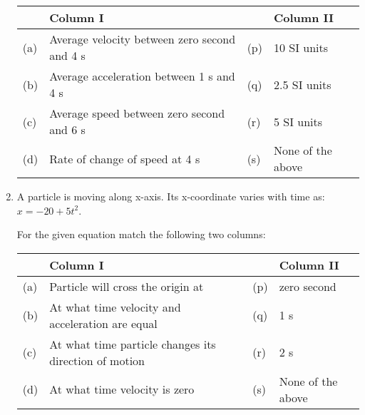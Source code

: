 \documentclass{article}
\begin{document}
\begin{enumerate}
    \begin{center}
        \renewcommand{\arraystretch}{2}
        \begin{table}[h]
            \centering
            \begin{tabular}{p{0.25cm}p{7cm}|p{0.25cm}p{6cm}}
            \hline
            & Column I & & Column II \\
            \hline
            (a) & Average velocity between zero second and 4 s & (p) & 10 SI units \\
            (b) & Average acceleration between 1 s and 4 s & (q) & 2.5 SI units \\
            (c) & Average speed between zero second and 6 s & (r) & 5 SI units \\
            (d) & Rate of change of speed at 4 s & (s) & None of the above \\
            \hline
            \end{tabular}
        \end{table}
    \end{center}

    \pagebreak
    
    \item A particle is moving along x-axis. Its x-coordinate varies with time as: $x = -20 + 5t^2$.
    
    For the given equation match the following two columns:
    
    \begin{center}
        \renewcommand{\arraystretch}{2}
        \begin{table}[h]
            \centering
            \begin{tabular}{p{0.25cm}p{8cm}|p{0.25cm}p{5cm}}
            \hline
            & Column I & & Column II \\
            \hline
            (a) & Particle will cross the origin at & (p) & zero second \\
            (b) & At what time velocity and acceleration are equal & (q) & 1 s \\
            (c) & At what time particle changes its direction of motion & (r) & 2 s \\
            (d) & At what time velocity is zero & (s) & None of the above \\
            \hline
            \end{tabular}
        \end{table}
    \end{center}


\end{enumerate}
\end{document}
